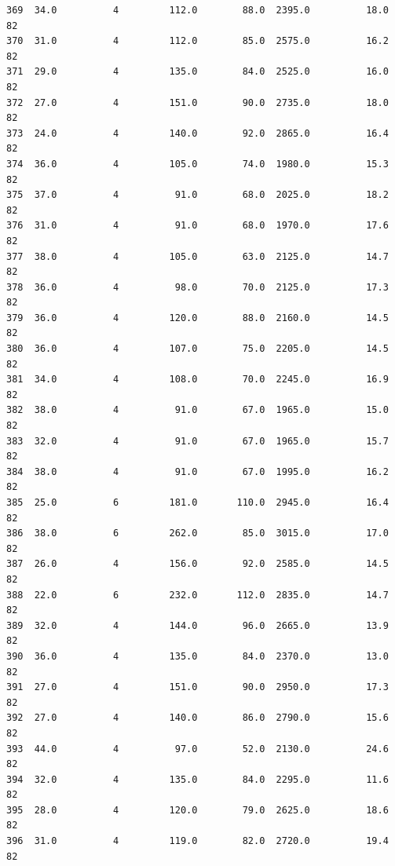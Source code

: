 \documentclass[11pt]{article}
\begin{document}
\begin{tcolorbox}[breakable, size=fbox, boxrule=.5pt, pad at break*=1mm, opacityfill=0]
\begin{Verbatim}[commandchars=\\\{\}]
369  34.0          4         112.0        88.0  2395.0          18.0    82
370  31.0          4         112.0        85.0  2575.0          16.2    82
371  29.0          4         135.0        84.0  2525.0          16.0    82
372  27.0          4         151.0        90.0  2735.0          18.0    82
373  24.0          4         140.0        92.0  2865.0          16.4    82
374  36.0          4         105.0        74.0  1980.0          15.3    82
375  37.0          4          91.0        68.0  2025.0          18.2    82
376  31.0          4          91.0        68.0  1970.0          17.6    82
377  38.0          4         105.0        63.0  2125.0          14.7    82
378  36.0          4          98.0        70.0  2125.0          17.3    82
379  36.0          4         120.0        88.0  2160.0          14.5    82
380  36.0          4         107.0        75.0  2205.0          14.5    82
381  34.0          4         108.0        70.0  2245.0          16.9    82
382  38.0          4          91.0        67.0  1965.0          15.0    82
383  32.0          4          91.0        67.0  1965.0          15.7    82
384  38.0          4          91.0        67.0  1995.0          16.2    82
385  25.0          6         181.0       110.0  2945.0          16.4    82
386  38.0          6         262.0        85.0  3015.0          17.0    82
387  26.0          4         156.0        92.0  2585.0          14.5    82
388  22.0          6         232.0       112.0  2835.0          14.7    82
389  32.0          4         144.0        96.0  2665.0          13.9    82
390  36.0          4         135.0        84.0  2370.0          13.0    82
391  27.0          4         151.0        90.0  2950.0          17.3    82
392  27.0          4         140.0        86.0  2790.0          15.6    82
393  44.0          4          97.0        52.0  2130.0          24.6    82
394  32.0          4         135.0        84.0  2295.0          11.6    82
395  28.0          4         120.0        79.0  2625.0          18.6    82
396  31.0          4         119.0        82.0  2720.0          19.4    82


\end{Verbatim}
\end{tcolorbox}
\end{document}
